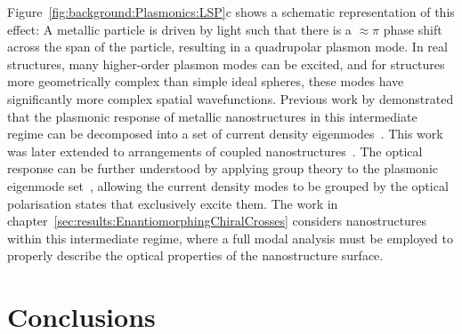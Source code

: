 Figure~\ref{fig:background:Plasmonics:LSP}c shows a schematic representation of this effect: A metallic particle is driven by light such that there is a $\approx \pi$ phase shift across the span of the particle, resulting in a quadrupolar plasmon mode. In real structures, many higher-order plasmon modes can be excited, and for structures more geometrically complex than simple ideal spheres, these modes have significantly more complex spatial wavefunctions. Previous work by demonstrated that the plasmonic response of metallic nanostructures in this intermediate regime can be decomposed into a set of current density eigenmodes~\cite{Zheng2012}. This work was later extended to arrangements of coupled nanostructures~\cite{Zheng2013}. The optical response can be further understood by applying group theory to the plasmonic eigenmode set~\cite{Zheng2015}, allowing the current density modes to be grouped by the optical polarisation states that exclusively excite them. The work in chapter~\ref{sec:results:EnantiomorphingChiralCrosses} considers nanostructures within this intermediate regime, where a full modal analysis must be employed to properly describe the optical properties of the nanostructure surface.

\section{Conclusions}


